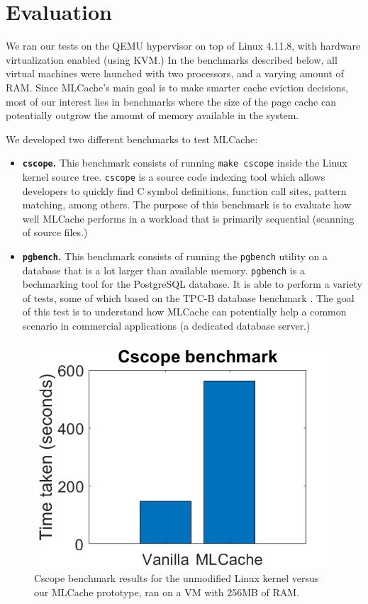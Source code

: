 \section{Evaluation}

We ran our tests on the QEMU \cite{qemu} hypervisor on top of Linux 4.11.8,
with hardware virtualization enabled (using KVM.) In the benchmarks described
below, all virtual machines were launched with two processors, and a varying
amount of RAM. Since MLCache's main goal is to make smarter cache eviction
decisions, most of our interest lies in benchmarks where the size of the page
cache can potentially outgrow the amount of memory available in the system.

We developed two different benchmarks to test MLCache:

\begin{itemize}
  \item \textbf{\texttt{cscope}.} This benchmark consists of running \texttt{make cscope}
    inside the Linux kernel source tree. \texttt{cscope} is a source code indexing
    tool which allows developers to quickly find C symbol definitions, function call
    sites, pattern matching, among others. The purpose of this benchmark is to evaluate
    how well MLCache performs in a workload that is primarily sequential (scanning of
    source files.)
  \item \textbf{\texttt{pgbench}.} This benchmark consists of running the \texttt{pgbench}
    utility on a database that is a lot larger than available memory. \texttt{pgbench} is a bechmarking
    tool for the PostgreSQL database. It is able to perform a variety of tests, some of
    which based on the TPC-B database benchmark \cite{tpcb}.  The goal of this test is to
    understand how MLCache can potentially help a common scenario in commercial applications
    (a dedicated database server.)
\end{itemize}

\label{fig:cscope}
\begin{figure}[h]
	\includegraphics[scale=0.4]{img/cscope_results_bigger.png}
	\caption{Cscope benchmark results for the unmodified Linux kernel versus our MLCache prototype, ran on a VM with 256MB of RAM.}
\end{figure}

